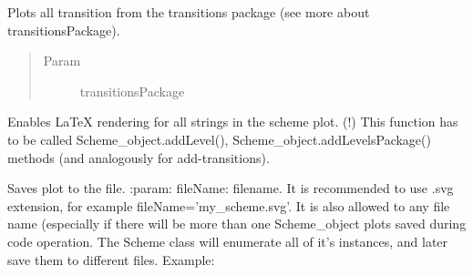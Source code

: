 \documentclass[letterpaper,10pt,english]{sphinxmanual}
\begin{document}
\begin{fulllineitems}
\begin{fulllineitems}
\begin{quote}
\begin{description}
\end{description}\end{quote}

\end{fulllineitems}


\begin{fulllineitems}
\label{\detokenize{nice_scheme_plotter:nice_scheme_plotter.Scheme.addTransitionsPackage}}
Plots all transition from the transitions package (see more about transitionsPackage).
\begin{quote}\begin{description}
\item[{Param}] \leavevmode
transitionsPackage

\end{description}\end{quote}

\end{fulllineitems}


\begin{fulllineitems}
\label{\detokenize{nice_scheme_plotter:nice_scheme_plotter.Scheme.enableLatex}}
Enables LaTeX rendering for all strings in the scheme plot.
(!) This function has to be called 
Scheme\_object.addLevel(), Scheme\_object.addLevelsPackage() methods (and analogously for add-transitions).

\end{fulllineitems}


\begin{fulllineitems}
\label{\detokenize{nice_scheme_plotter:nice_scheme_plotter.Scheme.save}}
Saves plot to the file.
:param: fileName: filename. It is recommended to use .svg extension, for example fileName=’my\_scheme.svg’. It is
also allowed to  any file name (especially if there will be more than one Scheme\_object plots saved
during code operation. The Scheme class will enumerate all of it’s instances, and later save them to different
files. Example:


\end{fulllineitems}
\end{fulllineitems}
\end{document}
